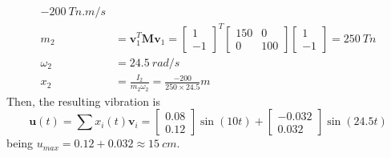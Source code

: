 \begin{Answer}[ref={two_storey_helicopter}]
\begin{align*}
    \SI{-200}{Tn.m/s} \\
    m_2 &= \mathbf{v}_1^T\mathbf{M}\mathbf{v}_1 =
    \begin{bmatrix}1 \\ -1\end{bmatrix}^T \begin{bmatrix}150 & 0 \\ 0 & 100\end{bmatrix} \begin{bmatrix}1 \\ -1\end{bmatrix} =
    \SI{250}{Tn} \\
    \omega_2 &= \SI{24.5}{rad/s} \\
    x_2 &= \frac{I_2}{m_2\omega_2} = \frac{-200}{250\times24.5} \si{m}
\end{align*}
Then, the resulting vibration is
$$
\mathbf{u}(t) = \sum x_i(t)\mathbf{v}_i =
\begin{bmatrix}0.08 \\ 0.12\end{bmatrix} \sin(10t) +
\begin{bmatrix}-0.032 \\ 0.032\end{bmatrix} \sin(24.5t)
$$
being $u_{max} = 0.12 + 0.032 \approx \SI{15}{cm}$.

\end{Answer}
